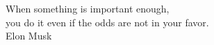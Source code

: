 \begin{dedication}
{\large{When something is important enough,\\you do it even if the odds are not in your favor.}}\\[5mm]
Elon Musk
\end{dedication}


